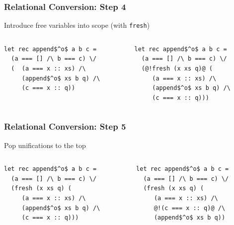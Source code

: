 \documentclass[xcolor=table]{beamer}
\begin{document}
\begin{frame}[fragile]
  \transwipe[direction=90]
  \frametitle{Relational Conversion: Step 4}
\begin{center}
Introduce free variables into scope  (with \lstinline{fresh})
\end{center}

\begin{columns}
\begin{column}{0.5\textwidth}
\begin{lstlisting}
let rec append$^o$ a b c =
  (a === [] /\ b === c) \/
  (  (a === x :: xs) /\
     (append$^o$ xs b q) /\
     (c === x :: q))
\end{lstlisting}
\end{column}
\begin{column}{0.5\textwidth}  
\begin{lstlisting}
let rec append$^o$ a b c =
  (a === [] /\ b === c) \/
  (@!fresh (x xs q)@ (
     (a === x :: xs) /\
     (append$^o$ xs b q) /\
     (c === x :: q)))
\end{lstlisting}
\end{column}
\end{columns}
\end{frame}


\begin{frame}[fragile]
  \transwipe[direction=90]
  \frametitle{Relational Conversion: Step 5}
\begin{center}  
Pop unifications to the top
\end{center}

\begin{columns}
\begin{column}{0.5\textwidth}
\begin{lstlisting}
let rec append$^o$ a b c =
  (a === [] /\ b === c) \/
  (fresh (x xs q) (
     (a === x :: xs) /\
     (append$^o$ xs b q) /\
     (c === x :: q)))
\end{lstlisting}
\end{column}
\begin{column}{0.5\textwidth}  
\begin{lstlisting}
let rec append$^o$ a b c =
  (a === [] /\ b === c) \/
  (fresh (x xs q) (
     (a === x :: xs) /\
     @!(c === x :: q)@ /\
     (append$^o$ xs b q))
\end{lstlisting}
\end{column}
\end{columns}
\end{frame}
\end{document}
